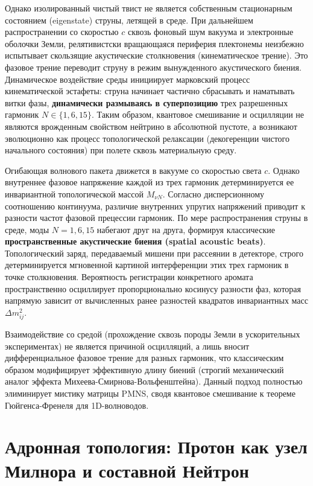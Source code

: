 \documentclass[11pt,a4paper]{article}
\begin{document}
	Однако изолированный чистый твист не является собственным стационарным состоянием (eigenstate) струны, летящей в среде. При дальнейшем распространении со скоростью $c$ сквозь фоновый шум вакуума и электронные оболочки Земли, релятивистски вращающаяся периферия плектонемы неизбежно испытывает скользящие акустические столкновения (кинематическое трение). 
	Это фазовое трение переводит струну в режим вынужденного акустического биения. Динамическое воздействие среды инициирует марковский процесс кинематической эстафеты: струна начинает частично сбрасывать и наматывать витки фазы, \textbf{динамически размываясь в суперпозицию} трех разрешенных гармоник $N \in \{1, 6, 15\}$. 
	Таким образом, квантовое смешивание и осцилляции не являются врожденным свойством нейтрино в абсолютной пустоте, а возникают эволюционно как процесс топологической релаксации (декогеренции чистого начального состояния) при полете сквозь материальную среду.
	
	Огибающая волнового пакета движется в вакууме со скоростью света $c$. Однако внутреннее фазовое напряжение каждой из трех гармоник детерминируется ее инвариантной топологической массой $M_{\nu N}$. Согласно дисперсионному соотношению континуума, различие внутренних упругих напряжений приводит к разности частот фазовой прецессии гармоник.
	По мере распространения струны в среде, моды $N=1, 6, 15$ набегают друг на друга, формируя классические \textbf{пространственные акустические биения (spatial acoustic beats)}. 
	Топологический заряд, передаваемый мишени при рассеянии в детекторе, строго детерминируется мгновенной картиной интерференции этих трех гармоник в точке столкновения. Вероятность регистрации конкретного аромата пространственно осциллирует пропорционально косинусу разности фаз, которая напрямую зависит от вычисленных ранее разностей квадратов инвариантных масс $\Delta m^2_{ij}$. 
	
	Взаимодействие со средой (прохождение сквозь породы Земли в ускорительных экспериментах) не является причиной осцилляций, а лишь вносит дифференциальное фазовое трение для разных гармоник, что классическим образом модифицирует эффективную длину биений (строгий механический аналог эффекта Михеева-Смирнова-Вольфенштейна). Данный подход полностью элиминирует мистику матрицы PMNS, сводя квантовое смешивание к теореме Гюйгенса-Френеля для 1D-волноводов.
	
	\section{Адронная топология: Протон как узел Милнора и составной Нейтрон}
	
\end{document}
